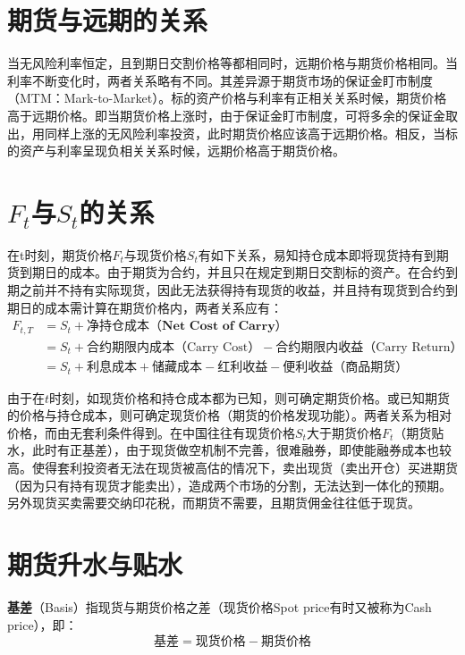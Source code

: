\documentclass[11pt]{article}
\begin{document}
\section{期货与远期的关系}
当无风险利率恒定，且到期日交割价格等都相同时，远期价格与期货价格相同。当利率不断变化时，两者关系略有不同。其差异源于期货市场的保证金盯市制度（MTM：Mark-to-Market）。标的资产价格与利率有正相关关系时候，期货价格高于远期价格。即当期货价格上涨时，由于保证金盯市制度，可将多余的保证金取出，用同样上涨的无风险利率投资，此时期货价格应该高于远期价格。相反，当标的资产与利率呈现负相关关系时候，远期价格高于期货价格。

\section{$F_t$与$S_t$的关系}
在t时刻，期货价格$F_t$与现货价格$S_t$有如下关系，易知持仓成本即将现货持有到期货到期日的成本。由于期货为合约，并且只在规定到期日交割标的资产。在合约到期之前并不持有实际现货，因此无法获得持有现货的收益，并且持有现货到合约到期日的成本需计算在期货价格内，两者关系应有：
\begin{align*}
    F_{t,T} &= S_t + \textbf{净持仓成本（Net Cost of Carry）} \\
    &= S_t + \text{合约期限内成本（Carry Cost）} - \text{合约期限内收益（Carry Return）} \\
    &= S_t + \text{利息成本} + \text{储藏成本} - \text{红利收益} - \text{便利收益（商品期货）}
\end{align*}

由于在$t$时刻，如现货价格和持仓成本都为已知，则可确定期货价格。或已知期货的价格与持仓成本，则可确定现货价格（期货的价格发现功能）。两者关系为相对价格，而由无套利条件得到。在中国往往有现货价格$S_t$大于期货价格$F_t$（期货贴水，此时有正基差），由于现货做空机制不完善，很难融券，即使能融券成本也较高。使得套利投资者无法在现货被高估的情况下，卖出现货（卖出开仓）买进期货（因为只有持有现货才能卖出），造成两个市场的分割，无法达到一体化的预期。另外现货买卖需要交纳印花税，而期货不需要，且期货佣金往往低于现货。

\section{期货升水与贴水}
\textbf{基差}（Basis）指现货与期货价格之差（现货价格Spot price有时又被称为Cash price），即：
\begin{equation*}
    \text{基差} = \text{现货价格} - \text{期货价格}
\end{equation*}
\end{document}

